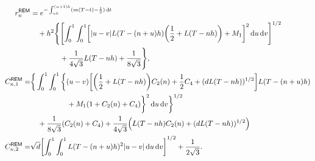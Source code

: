 \begin{proposition}
\begin{enumerate}[label=\textbf{(\arabic*)}, leftmargin=2em]
\begin{align*}
            r_n^{\sf REM}&=e^{-\int_{nh}^{(n+1)h}(m(T-t)-\frac{1}{2})\rmd t}\\
            &\quad +h^2\Bigg\{\left[\int_0^1\int_0^1\left[|u-v|L(T-(n+u)h)\left(\dfrac{1}{2}+L(T-nh)\right)+M_1\right]^2\rmd u\rmd v\right]^{1/2}\\
            &\qquad\qquad+\dfrac{1}{4\sqrt{3}}L(T-nh)+\dfrac{1}{8\sqrt{3}}\Bigg\},\\
            C_{n,1}^{\sf REM}=&\bigg\{\int_0^1\int_0^1\bigg\{(u-v)\left[\left(\dfrac{1}{2}+L(T-nh)\right)C_2(n)+\dfrac{1}{2}C_4+(dL(T-nh))^{1/2}\right]L(T-(n+u)h)\\
            &\qquad\qquad\quad+M_1(1+C_2(n)+C_4)\bigg\}^2\rmd u\rmd v\bigg\}^{1/2}\\
            &\quad+\dfrac{1}{8\sqrt{3}}(C_2(n)+C_4)+\dfrac{1}{4\sqrt{3}}\left(L(T-nh)C_2(n)+(dL(T-nh))^{1/2}\right)\\
            C_{n,2}^{\sf REM}=&\sqrt{d}\left[\int_0^1\int_0^1L(T-(n+u)h)^2|u-v|\rmd u\rmd v\right]^{1/2}+\dfrac{1}{2\sqrt{3}}.
        \end{align*}
    \end{enumerate}
\end{proposition}


